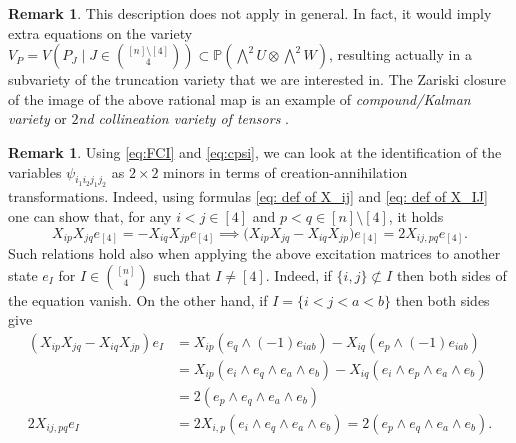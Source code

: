 \documentclass[11pt,reqno]{amsart}
\theoremstyle{definition}
\newtheorem{remark}[theorem]{Remark}
\numberwithin{theorem}{section}
\numberwithin{equation}{section}
\begin{document}
\begin{remark}
This description does not apply in general. In fact, it would imply extra equations on the variety $V_P=V(P_J \mid J \in \binom{[n]\setminus [4]}{4}) \subset \mathbb P(\bigwedge^2U \otimes \bigwedge^2W)$, resulting actually in a subvariety of the truncation variety that we are interested in. The Zariski closure of the image of the above rational map is an example of {\em compound/Kalman variety} \cite{kalman2025} or {\em $2$nd collineation variety of tensors} \cite{gesmundo2025collineation}.
\end{remark}

\begin{remark}
Using \eqref{eq:FCI} and \eqref{eq:cpsi}, we can look at the identification of the variables $\psi_{i_1i_2j_1j_2}$ as $2\times 2$ minors in terms of creation-annihilation transformations. Indeed, using formulas \eqref{eq: def of X_ij} and \eqref{eq: def of X_IJ} one can show that, for any $i< j \in [4]$ and $p< q \in [n]\setminus [4]$, it holds
\[ 
X_{ip}X_{jq}e_{[4]} = - X_{iq}X_{jp}e_{[4]} \implies \big(X_{ip}X_{jq} - X_{iq}X_{jp}\big) e_{[4]} = 2 X_{ij,pq}e_{[4]} .
\]
Such relations hold also when applying the above excitation matrices to another state $e_I$ for $I \in \binom{[n]}{4}$ such that $I \neq [4]$. Indeed, if $\{i,j\} \not \subset I$ then both sides of the equation vanish. On the other hand, if $I=\{i < j < a < b\}$ then both sides give
\begin{align*}
(X_{ip}X_{jq} - X_{iq}X_{jp})e_I & = X_{ip}(e_{q}\wedge (-1)e_{iab}) - X_{iq}(e_p \wedge (-1)e_{iab}) \\
& = X_{ip}(e_i\wedge e_q \wedge e_a \wedge e_b) - X_{iq}(e_i \wedge e_p \wedge e_a \wedge e_b) \\
& = 2 (e_p \wedge e_q \wedge e_a \wedge e_b) \\
2X_{ij,pq}e_I & = 2 X_{i,p}(e_i \wedge e_q \wedge e_a \wedge e_b) = 2 (e_p \wedge e_q \wedge e_a \wedge e_b) .
\end{align*}
\end{remark}
\end{document}
